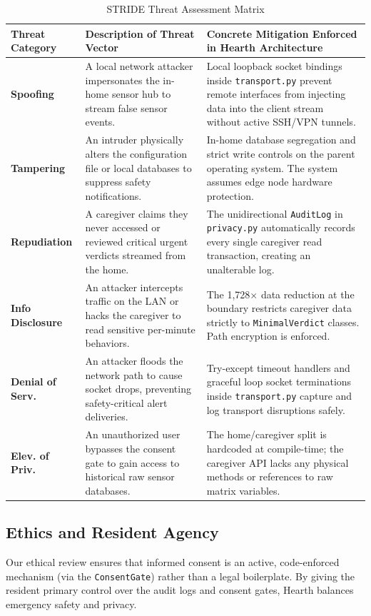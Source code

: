 \documentclass[conference]{IEEEtran}
\begin{document}
\begin{table}[htbp]
\centering
\caption{STRIDE Threat Assessment Matrix}
\begin{tabular}{lp{5.2cm}p{9.4cm}}
\toprule
Threat Category & Description of Threat Vector & Concrete Mitigation Enforced in Hearth Architecture \\
\midrule
\textbf{Spoofing} & A local network attacker impersonates the in-home sensor hub to stream false sensor events. & Local loopback socket bindings inside \texttt{transport.py} prevent remote interfaces from injecting data into the client stream without active SSH/VPN tunnels. \\
\textbf{Tampering} & An intruder physically alters the configuration file or local databases to suppress safety notifications. & In-home database segregation and strict write controls on the parent operating system. The system assumes edge node hardware protection. \\
\textbf{Repudiation} & A caregiver claims they never accessed or reviewed critical urgent verdicts streamed from the home. & The unidirectional \texttt{AuditLog} in \texttt{privacy.py} automatically records every single caregiver read transaction, creating an unalterable log. \\
\textbf{Info Disclosure} & An attacker intercepts traffic on the LAN or hacks the caregiver to read sensitive per-minute behaviors. & The 1,728$\times$ data reduction at the boundary restricts caregiver data strictly to \texttt{MinimalVerdict} classes. Path encryption is enforced. \\
\textbf{Denial of Serv.} & An attacker floods the network path to cause socket drops, preventing safety-critical alert deliveries. & Try-except timeout handlers and graceful loop socket terminations inside \texttt{transport.py} capture and log transport disruptions safely. \\
\textbf{Elev. of Priv.} & An unauthorized user bypasses the consent gate to gain access to historical raw sensor databases. & The home/caregiver split is hardcoded at compile-time; the caregiver API lacks any physical methods or references to raw matrix variables. \\
\bottomrule
\end{tabular}
\end{table}

\subsection{Ethics and Resident Agency}
Our ethical review ensures that informed consent is an active, code-enforced mechanism (via the \texttt{ConsentGate}) rather than a legal boilerplate. By giving the resident primary control over the audit logs and consent gates, Hearth balances emergency safety and privacy.
\end{document}
